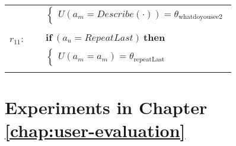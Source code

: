 \begin{small}
\begin{longtable}{p{1cm}p{14cm}}
& \;\;\;\;\; $ \begin{cases}U(\mathit{a_m}\!=\!\mathit{Describe(\cdot)})\!=\!\theta_{\mathrm{whatdoyousee2}} \end{cases}$ \\ \\[-2mm]
$r_{11}$: \ \ & $ \textbf{if} \ (\mathit{a_u}\!=\!\mathit{RepeatLast}) \ \textbf{then} $ \\
 & \;\;\;\;\; $ \begin{cases}U(\mathit{a_m}\!=\!\mathit{{a_m}})\!=\!\theta_{\mathrm{repeatLast}} \end{cases}$ \\ \\[-2mm]
\end{longtable}
\end{small}

\section{Experiments in Chapter \ref{chap:user-evaluation}}


